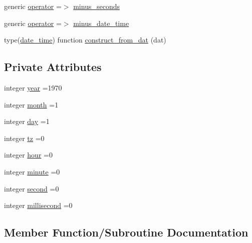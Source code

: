 \begin{DoxyCompactItemize}
\item 
generic \mbox{\hyperlink{structm__time_1_1date__time_affafbae65afa1e12c901241e641e4b1f}{operator}} =$>$ \mbox{\hyperlink{structm__time_1_1date__time_a54751a9b71d326e9ff2398031fcf0de9}{minus\+\_\+seconds}}
\item 
generic \mbox{\hyperlink{structm__time_1_1date__time_adc11c2984fd9dae163e44627a5e2a134}{operator}} =$>$ \mbox{\hyperlink{structm__time_1_1date__time_a590025bad9fe71932ef3d06ca4a3c613}{minus\+\_\+date\+\_\+time}}
\item 
type(\mbox{\hyperlink{structm__time_1_1date__time}{date\+\_\+time}}) function \mbox{\hyperlink{structm__time_1_1date__time_aa431f7c4e9a44ca1ddb3446b28f53547}{construct\+\_\+from\+\_\+dat}} (dat)
\end{DoxyCompactItemize}
\subsection*{Private Attributes}
\begin{DoxyCompactItemize}
\item 
integer \mbox{\hyperlink{structm__time_1_1date__time_aadd87661407a53f0b50fe7fc47038f52}{year}} =1970
\item 
integer \mbox{\hyperlink{structm__time_1_1date__time_aa0360a36979a7e0f621770379d432032}{month}} =1
\item 
integer \mbox{\hyperlink{structm__time_1_1date__time_a7bfa953907e96e82128a4ab5eac0a33e}{day}} =1
\item 
integer \mbox{\hyperlink{structm__time_1_1date__time_a74edfe999538728025d729a7ce69fddc}{tz}} =0
\item 
integer \mbox{\hyperlink{structm__time_1_1date__time_a95fab5ef1aea89d18411f26f34192f1a}{hour}} =0
\item 
integer \mbox{\hyperlink{structm__time_1_1date__time_a9ac3edac50f8a4aae577b1c889404837}{minute}} =0
\item 
integer \mbox{\hyperlink{structm__time_1_1date__time_a22161ace4be90b741a1600435588fc64}{second}} =0
\item 
integer \mbox{\hyperlink{structm__time_1_1date__time_a9a2f1be9348dd330a30ffd207c0791fc}{millisecond}} =0
\end{DoxyCompactItemize}


\subsection{Member Function/\+Subroutine Documentation}
\mbox{\label{structm__time_1_1date__time_aa431f7c4e9a44ca1ddb3446b28f53547}} 
